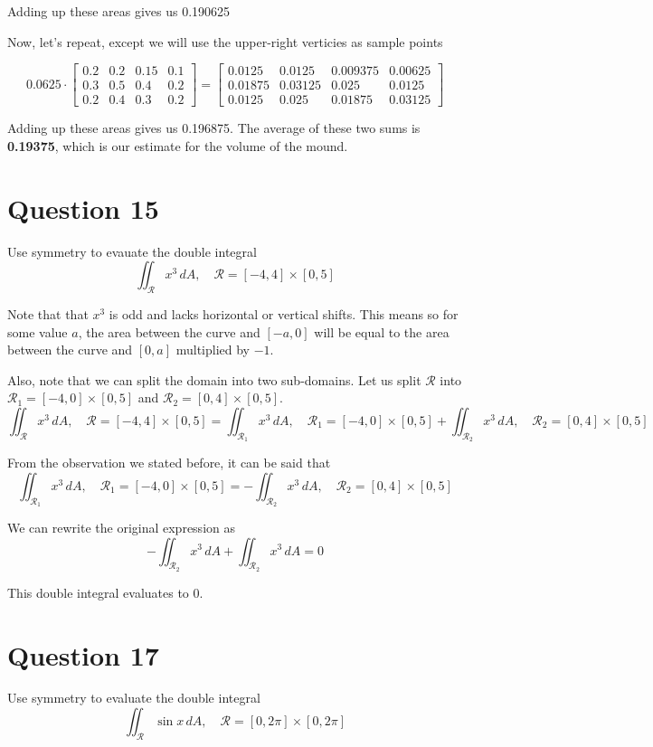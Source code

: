 \documentclass[hidelinks]{article}
\begin{document}
Adding up these areas gives us 0.190625

Now, let's repeat, except we will use the upper-right verticies as sample points

\[ 0.0625 \cdot \begin{bmatrix}
	0.2  & 0.2  & 0.15 & 0.1 \\ 
	0.3  & 0.5  & 0.4  & 0.2 \\
	0.2  & 0.4  & 0.3  & 0.2
\end{bmatrix} = 
\begin{bmatrix}
	0.0125 & 0.0125 & 0.009375 & 0.00625 \\ 
	0.01875 & 0.03125 & 0.025 & 0.0125 \\
	0.0125 & 0.025 & 0.01875 & 0.03125
\end{bmatrix} \]

Adding up these areas gives us 0.196875. The average of these two sums is \textbf{0.19375}, which is our estimate for the volume of the mound.
\newpage
\section{Question 15}
Use symmetry to evauate the double integral
\[
	\iint_\mathcal{R} x^3 \,dA, \quad \mathcal{R} = [-4, 4] \times [0, 5]
\]

Note that that $x^3$ is odd and lacks horizontal or vertical shifts. This means so for some value $a$, the area between the curve and $[-a, 0]$ will be equal to the area between the curve and $[0, a]$ multiplied by $-1$.

Also, note that we can split the domain into two sub-domains. Let us split $\mathcal{R}$ into $\mathcal{R}_1 = [-4, 0] \times [0, 5]$ and $\mathcal{R}_2 = [0, 4] \times [0, 5]$.
\[
	\iint_\mathcal{R} x^3 \,dA, \quad \mathcal{R} = [-4, 4] \times [0, 5] = 
\iint_{\mathcal{R}_1} x^3 \,dA, \quad \mathcal{R}_1 = [-4, 0] \times [0, 5] + 
	\iint_{\mathcal{R}_2} x^3 \,dA, \quad \mathcal{R}_2 = [0, 4] \times [0, 5]
\]

From the observation we stated before, it can be said that 
\[
\iint_{\mathcal{R}_1} x^3 \,dA, \quad \mathcal{R}_1 = [-4, 0] \times [0, 5] =  
	-\iint_{\mathcal{R}_2} x^3 \,dA, \quad \mathcal{R}_2 = [0, 4] \times [0, 5]
\]

We can rewrite the original expression as 
\[
-\iint_{\mathcal{R}_2} x^3 \,dA + 
	\iint_{\mathcal{R}_2} x^3 \,dA = 0 
\]

This double integral evaluates to 0.
\newpage
\section{Question 17}
Use symmetry to evaluate the double integral
\[
	\iint_\mathcal{R} \sin{x} \,dA, \quad \mathcal{R} = [0, 2\pi] \times [0, 2\pi]
\]
\end{document}
